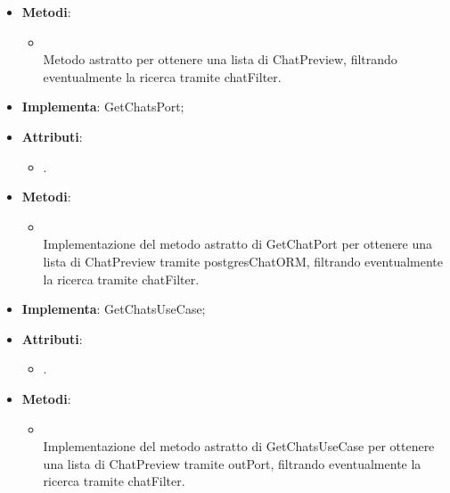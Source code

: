 \documentclass[10pt, a4paper]{article}
\begin{document}
\label{GetChatsPortDettaglio}
\begin{itemize}
    \item \textbf{Metodi}:
    \begin{itemize}
        \item {}\\
        Metodo astratto per ottenere una lista di ChatPreview, filtrando eventualmente la ricerca tramite chatFilter.
    \end{itemize}
\end{itemize}

\label{GetChatsPostgresDettaglio}
\begin{itemize}
    \item \textbf{Implementa}: GetChatsPort;
    \item \textbf{Attributi}:
    \begin{itemize}
        \item {}.
    \end{itemize}
    \item \textbf{Metodi}:
    \begin{itemize}
        \item {}\\
        Implementazione del metodo astratto di GetChatPort per ottenere una lista di ChatPreview tramite postgresChatORM, filtrando eventualmente la ricerca tramite chatFilter.
        
    \end{itemize}
\end{itemize}


\label{GetChatsServiceDettaglio}
\begin{itemize}
    \item \textbf{Implementa}: GetChatsUseCase;
    \item \textbf{Attributi}:
    \begin{itemize}
        \item {}.
    \end{itemize}
    \item \textbf{Metodi}:
    \begin{itemize}
        \item {}\\
        Implementazione del metodo astratto di GetChatsUseCase per ottenere una lista di ChatPreview tramite outPort, filtrando eventualmente la ricerca tramite chatFilter.
    \end{itemize}
\end{itemize}
\end{document}
